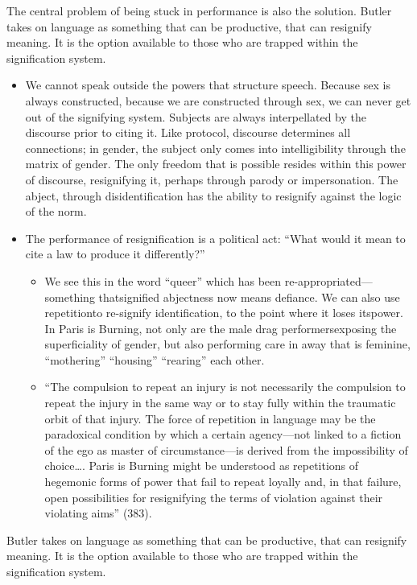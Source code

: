 \documentclass[11pt]{article}
\begin{document}
\begin{enumerate}
The central problem of being stuck in performance is also the
solution. Butler takes on language as something that can be
productive, that can resignify meaning. It is the option available to
those who are trapped within the signification system.

\begin{itemize}
\item We cannot speak outside the powers that structure speech. Because
sex is always constructed, because we are constructed through sex,
we can never get out of the signifying system. Subjects are always
interpellated by the discourse prior to citing it. Like protocol,
discourse determines all connections; in gender, the subject only
comes into intelligibility through the matrix of gender. The only
freedom that is possible resides within this power of discourse,
resignifying it, perhaps through parody or impersonation. The
abject, through disidentification has the ability to resignify
against the logic of the norm.
\item The performance of resignification is a political act: “What would
it mean to cite a law to produce it differently?”
\begin{itemize}
\item We see this in the word “queer” which has been
re-appropriated---something thatsignified abjectness now means
defiance. We can also use repetitionto re-signify
identification, to the point where it loses itspower. In Paris
is Burning, not only are the male drag performersexposing the
superficiality of gender, but also performing care in away that
is feminine, “mothering” “housing” “rearing” each other.
\item “The compulsion to repeat an injury is not necessarily the
compulsion to repeat the injury in the same way or to stay fully
within the traumatic orbit of that injury. The force of repetition
in language may be the paradoxical condition by which a certain
agency---not linked to a fiction of the ego as master of
circumstance---is derived from the impossibility of choice…. Paris
is Burning might be understood as repetitions of hegemonic forms of
power that fail to repeat loyally and, in that failure, open
possibilities for resignifying the terms of violation against their
violating aims” (383).
\end{itemize}
\end{itemize}

Butler takes on language as something that can be productive, that can
resignify meaning. It is the option available to those who are trapped
within the signification system. 


\end{enumerate}
\end{document}
